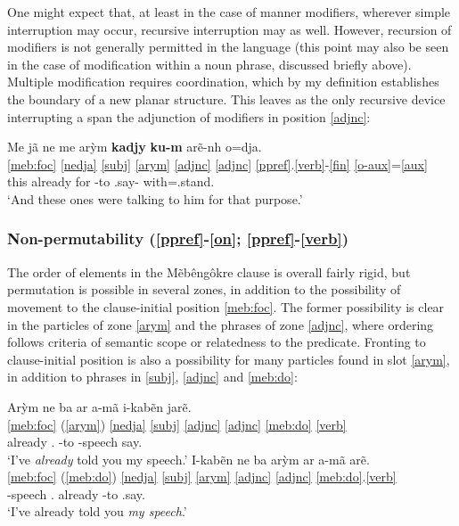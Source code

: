 \documentclass[output=paper]{langscibook}
\begin{document}
One might expect that, at least in the case of manner modifiers, wherever simple interruption may occur, recursive interruption may as well. However, recursion of modifiers is not generally permitted in the language (this point may also be seen in the case of modification within a noun phrase, discussed briefly above). Multiple modification requires coordination, which by my definition establishes the boundary of a new planar structure. This leaves as the only recursive device interrupting a span the adjunction of modifiers in position \ref{adjnc}:

\ea\glll Me jã ne me arỳm {\bfseries kadjy} {\bfseries ku-m} arẽ-nh o=dja.\\
      \ref{meb:foc} {} \ref{nedja} \ref{subj} \ref{arym} \ref{adjnc} \ref{adjnc} \ref{ppref}.\ref{verb}-\ref{fin} \ref{o-aux}=\ref{aux}\\
      \Pl{} this \Nfut{} \Pl{} already for \Third\Acc{}-to \Third.say-\Nfin{} with=\Third.stand.\Fin\\
    \glt `And these ones were talking to him for that purpose.'
\z


\largerpage[2]
\subsubsection{Non-permutability (\ref{ppref}-\ref{on}; \ref{ppref}-\ref{verb})}

The order of elements in the Mẽbêngôkre clause is overall fairly rigid, but permutation is possible in several zones, in addition to the possibility of movement to the clause-initial position \ref{meb:foc}. The former possibility is clear in the particles of zone \ref{arym} and the phrases of zone \ref{adjnc}, where ordering follows criteria of semantic scope or relatedness to the predicate. Fronting to clause-initial position is also a possibility for many particles found in slot \ref{arym}, in addition to phrases in \ref{subj}, \ref{adjnc} and \ref{meb:do}:

\ea
  \ea\glll Arỳm ne ba ar a-mã i-kabẽn jarẽ.\\
       {\ref{meb:foc} (\ref{arym})} \ref{nedja} \ref{subj} \ref{adjnc} \ref{adjnc} \ref{meb:do} \ref{verb}\\
       already \Nfut{} \First.\Nom{} \Pauc{} \Second-to \First-speech say.\Fin\\
    \glt `I've {\em already} told you my speech.'
  \ex\glll I-kabẽn ne ba arỳm ar a-mã arẽ.\\
       {\ref{meb:foc} (\ref{meb:do})} \ref{nedja} \ref{subj} \ref{arym} \ref{adjnc} \ref{adjnc} \ref{meb:do}.\ref{verb}\\
       \First-speech \Nfut{} \First.\Nom{} already \Pauc{} \Second-to \Third.say.\Fin\\
    \glt `I've already told you {\em my speech}.'
  \z
\z
\end{document}
